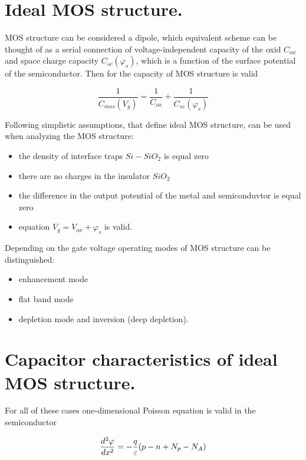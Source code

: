 \section{Ideal MOS structure.}

MOS structure can be considered a dipole, which equivalent scheme can
be thought of as a serial connection of voltage-independent capacity
of the oxid $C_{ox}$ and space charge capacity $C_{sc}(\varphi_{s})$,
which is a function of the surface potential of the
semiconductor. Then for the capacity of MOS structure is
valid~\cite{I.1}

\begin{equation}\label{eq:1.1}
  \frac{1}{C_{mos}(V_g)} = \frac{1}{C_{ox}} + \frac{1}{C_{sc}(\varphi_s)}
\end{equation}

Following simplistic assumptions, that define ideal MOS structure, can
be used when analyzing the MOS structure:

\begin{itemize}
\item the density of interface traps $Si-SiO_2$ is equal zero
\item there are no charges in the insulator $SiO_2$
\item the difference in the output potential of the metal and
  semiconduvtor is equal zero
\item equation $V_{g}=V_{ox}+\varphi_{s}$ is valid.
\end{itemize}

\noindent Depending on the gate voltage operating modes of MOS
structure can be distinguished:

\begin{itemize}
\item enhancement mode
\item flat band mode
\item depletion mode and inversion (deep depletion).
\end{itemize}

\section{Capacitor characteristics of ideal MOS structure.}

For all of these cases one-dimensional Poisson equation is valid in
the semiconductor

\begin{equation}\label{eq:1.2}\index{Poisson equation}
  \frac{d^2\varphi}{dx^2}=-\frac{q}{\varepsilon}(p-n+N_{p}-N_{A})
\end{equation}

